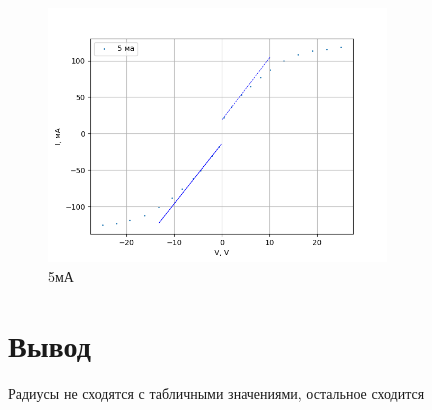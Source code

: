 \documentclass[12pt,a4paper]{article}
\begin{document}
\begin{figure}[H]
  \centering
  \includegraphics*[width=0.8\textwidth]{отдельный график 5мА.png}
  \caption{5мА}
\end{figure}

\section*{Вывод}
Радиусы не сходятся с табличными значениями, остальное сходится
\end{document}
